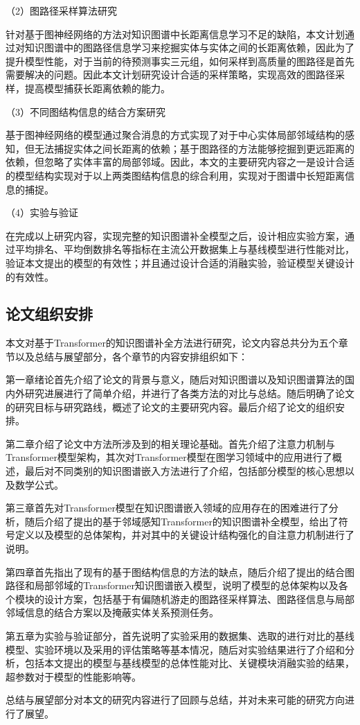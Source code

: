 （2）图路径采样算法研究

针对基于图神经网络的方法对知识图谱中长距离信息学习不足的缺陷，本文计划通过对知识图谱中的图路径信息学习来挖掘实体与实体之间的长距离依赖，因此为了提升模型性能，对于当前的待预测事实三元组，如何采样到高质量的图路径是首先需要解决的问题。因此本文计划研究设计合适的采样策略，实现高效的图路径采样，提高模型捕获长距离依赖的能力。

（3）不同图结构信息的结合方案研究

基于图神经网络的模型通过聚合消息的方式实现了对于中心实体局部邻域结构的感知，但无法捕捉实体之间长距离的依赖；基于图路径的方法能够挖掘到更远距离的依赖，但忽略了实体丰富的局部邻域。因此，本文的主要研究内容之一是设计合适的模型结构实现对于以上两类图结构信息的综合利用，实现对于图谱中长短距离信息的捕捉。

（4）实验与验证

在完成以上研究内容，实现完整的知识图谱补全模型之后，设计相应实验方案，通过平均排名、平均倒数排名等指标在主流公开数据集上与基线模型进行性能对比，验证本文提出的模型的有效性；并且通过设计合适的消融实验，验证模型关键设计的有效性。

\subsection{论文组织安排}
本文对基于Transformer的知识图谱补全方法进行研究，论文内容总共分为五个章节以及总结与展望部分，各个章节的内容安排组织如下：

第一章绪论首先介绍了论文的背景与意义，随后对知识图谱以及知识图谱算法的国内外研究进展进行了简单介绍，并进行了各类方法的对比与总结。随后明确了论文的研究目标与研究路线，概述了论文的主要研究内容。最后介绍了论文的组织安排。

第二章介绍了论文中方法所涉及到的相关理论基础。首先介绍了注意力机制与Transformer模型架构，其次对Transformer模型在图学习领域中的应用进行了概述，最后对不同类别的知识图谱嵌入方法进行了介绍，包括部分模型的核心思想以及数学公式。

第三章首先对Transformer模型在知识图谱嵌入领域的应用存在的困难进行了分析，随后介绍了提出的基于邻域感知Transformer的知识图谱补全模型，给出了符号定义以及模型的总体架构，并对其中的关键设计结构强化的自注意力机制进行了说明。

第四章首先指出了现有的基于图结构信息的方法的缺点，随后介绍了提出的结合图路径和局部邻域的Transformer知识图谱嵌入模型，说明了模型的总体架构以及各个模块的设计方案，包括基于有偏随机游走的图路径采样算法、图路径信息与局部邻域信息的结合方案以及掩蔽实体关系预测任务。

第五章为实验与验证部分，首先说明了实验采用的数据集、选取的进行对比的基线模型、实验环境以及采用的评估策略等基本情况，随后对实验结果进行了介绍和分析，包括本文提出的模型与基线模型的总体性能对比、关键模块消融实验的结果，超参数对于模型的性能影响等。

总结与展望部分对本文的研究内容进行了回顾与总结，并对未来可能的研究方向进行了展望。
